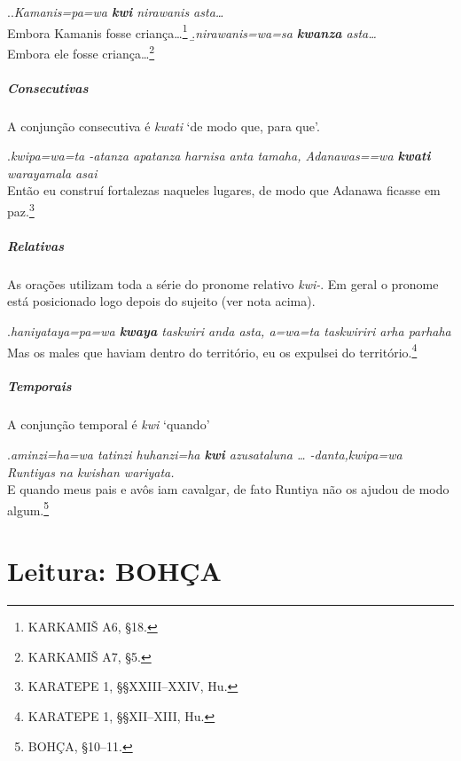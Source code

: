\ex.\a.\emph{Kamanis=pa=wa \textbf{kwi} nirawanis asta\ldots{}}\\
Embora Kamanis fosse criança\ldots{}\footnote{KARKAMIŠ A6, §18.}
\b.\emph{nirawanis=wa=sa \textbf{kwanza} asta\ldots{}}\\
Embora ele fosse criança\ldots{}\footnote{KARKAMIŠ A7, §5.}


\paragraph{Consecutivas}
A conjunção consecutiva é \emph{kwati} `de modo que, para que'.

\ex.\emph{kwipa=wa=ta -atanza apatanza harnisa anta tamaha,
	Adanawas=\linebreak=wa
	\textbf{kwa\-ti} warayamala asai}\\
Então eu construí fortalezas naqueles lugares, de modo que Adanawa\linebreak
ficasse em paz.\footnote{KARATEPE 1, §§XXIII--XXIV, Hu.}

\paragraph{Relativas}
As orações utilizam toda a série do pronome relativo \emph{kwi-}.
Em geral o pronome está posicionado logo depois do sujeito (ver nota acima).

\ex.\emph{haniyataya=pa=wa \textbf{kwaya} taskwiri anda asta, a=wa=ta
	taskwiriri arha par\-haha}\\
Mas os males que haviam dentro do território, eu os expulsei do
território.\footnote{KARATEPE 1, §§XII--XIII, Hu.}

\paragraph{Temporais}
A conjunção temporal é \emph{kwi} `quando'

\ex.\emph{aminzi=ha=wa tatinzi huhanzi=ha \textbf{kwi} azusataluna {\ldots}
	-danta,\linebreak kwipa=wa Runtiyas na
	kwishan wariyata.}\\
E quando meus pais e avôs iam cavalgar, de fato Runtiya não
os ajudou de modo algum.\footnote{BOHÇA, §10--11.}

\clearpage



\chapter{Leitura: BOHÇA}


